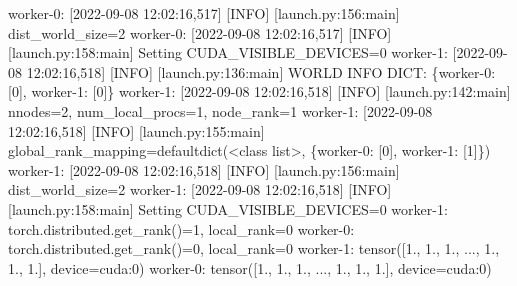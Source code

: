 \documentclass[
]{report}
\newenvironment{Shaded}{\begin{snugshade}}{\end{snugshade}}
\newcommand{\ErrorTok}[1]{\textcolor[rgb]{0.68,0.00,0.00}{#1}}
\newcommand{\ExtensionTok}[1]{\textcolor[rgb]{0.00,0.23,0.31}{#1}}
\newcommand{\KeywordTok}[1]{\textcolor[rgb]{0.00,0.23,0.31}{#1}}
\newcommand{\NormalTok}[1]{\textcolor[rgb]{0.00,0.23,0.31}{#1}}
\newcommand{\OperatorTok}[1]{\textcolor[rgb]{0.37,0.37,0.37}{#1}}
\newcommand{\PreprocessorTok}[1]{\textcolor[rgb]{0.68,0.00,0.00}{#1}}
\newcommand{\SpecialStringTok}[1]{\textcolor[rgb]{0.13,0.47,0.30}{#1}}
\newcommand{\StringTok}[1]{\textcolor[rgb]{0.13,0.47,0.30}{#1}}
\begin{document}
\begin{Shaded}
\begin{Highlighting}[]
\ExtensionTok{worker{-}0:}\NormalTok{ [2022{-}09{-}08 12:02:16,517] }\PreprocessorTok{[}\SpecialStringTok{INFO}\PreprocessorTok{]} \PreprocessorTok{[}\SpecialStringTok{launch.py:156:main}\PreprocessorTok{]}\NormalTok{ dist\_world\_size=2}
\ExtensionTok{worker{-}0:}\NormalTok{ [2022{-}09{-}08 12:02:16,517] }\PreprocessorTok{[}\SpecialStringTok{INFO}\PreprocessorTok{]} \PreprocessorTok{[}\SpecialStringTok{launch.py:158:main}\PreprocessorTok{]}\NormalTok{ Setting CUDA\_VISIBLE\_DEVICES=0}
\ExtensionTok{worker{-}1:}\NormalTok{ [2022{-}09{-}08 12:02:16,518] }\PreprocessorTok{[}\SpecialStringTok{INFO}\PreprocessorTok{]} \PreprocessorTok{[}\SpecialStringTok{launch.py:136:main}\PreprocessorTok{]}\NormalTok{ WORLD INFO DICT: \{}\StringTok{\textquotesingle{}worker{-}0\textquotesingle{}}\NormalTok{: }\PreprocessorTok{[}\SpecialStringTok{0}\PreprocessorTok{]}\NormalTok{, }\StringTok{\textquotesingle{}worker{-}1\textquotesingle{}}\NormalTok{: }\PreprocessorTok{[}\SpecialStringTok{0}\PreprocessorTok{]}\NormalTok{\}}
\ExtensionTok{worker{-}1:}\NormalTok{ [2022{-}09{-}08 12:02:16,518] }\PreprocessorTok{[}\SpecialStringTok{INFO}\PreprocessorTok{]} \PreprocessorTok{[}\SpecialStringTok{launch.py:142:main}\PreprocessorTok{]}\NormalTok{ nnodes=2, num\_local\_procs=1, node\_rank=1}
\ExtensionTok{worker{-}1:}\NormalTok{ [2022{-}09{-}08 12:02:16,518] }\PreprocessorTok{[}\SpecialStringTok{INFO}\PreprocessorTok{]} \PreprocessorTok{[}\SpecialStringTok{launch.py:155:main}\PreprocessorTok{]}\NormalTok{ global\_rank\_mapping=defaultdict}\ErrorTok{(}\OperatorTok{\textless{}}\NormalTok{class }\StringTok{\textquotesingle{}list\textquotesingle{}}\OperatorTok{\textgreater{}}\NormalTok{, }\ExtensionTok{\{}\StringTok{\textquotesingle{}worker{-}0\textquotesingle{}}\ExtensionTok{:} \PreprocessorTok{[}\SpecialStringTok{0}\PreprocessorTok{]}\NormalTok{, }\StringTok{\textquotesingle{}worker{-}1\textquotesingle{}}\NormalTok{: }\PreprocessorTok{[}\SpecialStringTok{1}\PreprocessorTok{]}\NormalTok{\}}\KeywordTok{)}
\ExtensionTok{worker{-}1:}\NormalTok{ [2022{-}09{-}08 12:02:16,518] }\PreprocessorTok{[}\SpecialStringTok{INFO}\PreprocessorTok{]} \PreprocessorTok{[}\SpecialStringTok{launch.py:156:main}\PreprocessorTok{]}\NormalTok{ dist\_world\_size=2}
\ExtensionTok{worker{-}1:}\NormalTok{ [2022{-}09{-}08 12:02:16,518] }\PreprocessorTok{[}\SpecialStringTok{INFO}\PreprocessorTok{]} \PreprocessorTok{[}\SpecialStringTok{launch.py:158:main}\PreprocessorTok{]}\NormalTok{ Setting CUDA\_VISIBLE\_DEVICES=0}
\ExtensionTok{worker{-}1:}\NormalTok{ torch.distributed.get\_rank}\ErrorTok{(}\KeywordTok{)}\ExtensionTok{=1,}\NormalTok{ local\_rank=0}
\ExtensionTok{worker{-}0:}\NormalTok{ torch.distributed.get\_rank}\ErrorTok{(}\KeywordTok{)}\ExtensionTok{=0,}\NormalTok{ local\_rank=0}
\ExtensionTok{worker{-}1:}\NormalTok{ tensor}\ErrorTok{(}\ExtensionTok{[1.,}\NormalTok{ 1., 1.,  ..., 1., 1., 1.], device=}\StringTok{\textquotesingle{}cuda:0\textquotesingle{}}\KeywordTok{)}
\ExtensionTok{worker{-}0:}\NormalTok{ tensor}\ErrorTok{(}\ExtensionTok{[1.,}\NormalTok{ 1., 1.,  ..., 1., 1., 1.], device=}\StringTok{\textquotesingle{}cuda:0\textquotesingle{}}\KeywordTok{)}
\end{Highlighting}
\end{Shaded}
\end{document}
